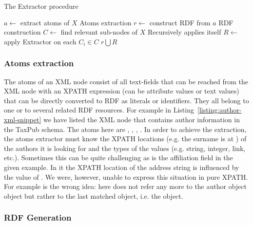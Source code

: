 \begin{algorithm}
\caption{The Extractor procedure}
\begin{algorithmic}[1]
\State $a \leftarrow$ extract atoms of $X$
\Comment Atoms extraction
\State $r \leftarrow$ construct RDF from $a$
\Comment RDF construction
\State $C \leftarrow$ find relevant sub-nodes of $X$
\Comment Recursively applies itself
\State $R \leftarrow$ apply Extractor on each $C_i \in C$
\State \Return $r \bigcup R$
\EndProcedure
\end{algorithmic}
\label{algo:extractor}
\end{algorithm}

\subsubsection{Atoms extraction}

The atoms of an XML node consist of all text-fields that can be reached from the XML node with an XPATH expression (can be attribute values or text values) that can be directly converted to RDF as literals or identifiers. They all belong to one or to several related RDF resources. For example in Listing~\ref{listing:author-xml-snippet} we have listed the XML node that contains author information in the TaxPub schema. The atoms here are , , , . In order to achieve the extraction, the atoms extractor must know the XPATH locations (e.g. the surname is at ) of the authors it is looking for and the types of the values (e.g. string, integer, link, etc.). Sometimes this can be quite challenging as is the affiliation field in the given example. In it the XPATH location of the address string is influenced by the value of . We were, however, unable to express this situation in pure XPATH. For example  is the wrong idea: here  does not refer any more to the author object object but rather to the last matched object, i.e. the  object.



\subsubsection{RDF Generation}

